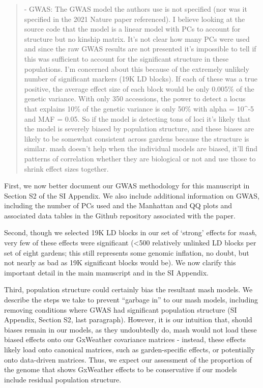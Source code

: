 \documentclass[
  letterpaper,
  DIV=11,
  numbers=noendperiod]{scrartcl}
\begin{document}
\begin{quote}
\begin{tcolorbox}[enhanced jigsaw, rightrule=.15mm, colframe=quarto-callout-warning-color-frame, leftrule=.75mm, arc=.35mm, colback=white, opacityback=0, left=2mm, breakable, toprule=.15mm, bottomrule=.15mm]

- GWAS: The GWAS model the authors use is not specified (nor was it
specified in the 2021 Nature paper referenced). I believe looking at the
source code that the model is a linear model with PCs to account for
structure but no kinship matrix. It's not clear how many PCs were used
and since the raw GWAS results are not presented it's impossible to tell
if this was sufficient to account for the significant structure in these
populations. I'm concerned about this because of the extremely unlikely
number of significant markers (19K LD blocks). If each of these was a
true positive, the average effect size of each block would be only
0.005\% of the genetic variance. With only 350 accessions, the power to
detect a locus that explains 10\% of the genetic variance is only 50\%
with alpha = 10\^{}-5 and MAF = 0.05. So if the model is detecting tons
of loci it's likely that the model is severely biased by population
structure, and these biases are likely to be somewhat consistent across
gardens because the structure is similar. mash doesn't help when the
individual models are biased, it'll find patterns of correlation whether
they are biological or not and use those to shrink effect sizes
together.

\end{tcolorbox}
\end{quote}

First, we now better document our GWAS methodology for this manuscript
in Section S2 of the SI Appendix. We also include additional information
on GWAS, including the number of PCs used and the Manhattan and QQ plots
and associated data tables in the Github repository associated with the
paper.

Second, though we selected 19K LD blocks in our set of `strong' effects
for \emph{mash}, very few of these effects were significant
(\textless500 relatively unlinked LD blocks per set of eight gardens;
this still represents some genomic inflation, no doubt, but not nearly
as bad as 19K significant blocks would be). We now clarify this
important detail in the main manuscript and in the SI Appendix.

Third, population structure could certainly bias the resultant mash
models. We describe the steps we take to prevent ``garbage in'' to our
mash models, including removing conditions where GWAS had significant
population structure (SI Appendix, Section S2, last paragraph). However,
it is our intuition that, should biases remain in our models, as they
undoubtedly do, mash would not load these biased effects onto our
GxWeather covariance matrices - instead, these effects likely load onto
canonical matrices, such as garden-specific effects, or potentially onto
data-driven matrices. Thus, we expect our assessment of the proportion
of the genome that shows GxWeather effects to be conservative if our
models include residual population structure.
\end{document}
